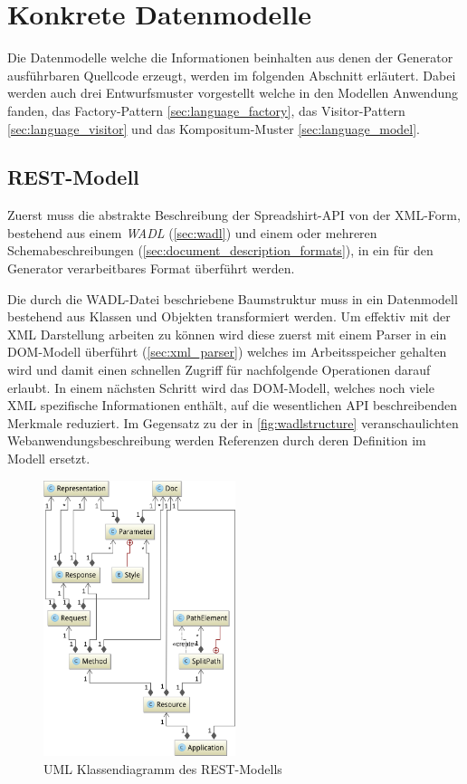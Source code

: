 \section{Konkrete Datenmodelle}
\label{sec:concrete_model}

Die Datenmodelle welche die Informationen beinhalten aus denen der Generator ausführbaren Quellcode erzeugt, werden im folgenden Abschnitt erläutert. Dabei werden auch drei Entwurfsmuster vorgestellt welche in den Modellen Anwendung fanden, das Factory-Pattern \cref{sec:language_factory}, das Visitor-Pattern \cref{sec:language_visitor} und das Kompositum-Muster \cref{sec:language_model}.

\subsection{REST-Modell}
\label{sec:rest_model}

Zuerst muss die abstrakte Beschreibung der Spreadshirt-API von der XML-Form, bestehend aus einem \emph{WADL} (\cref{sec:wadl}) und einem oder mehreren Schemabeschreibungen (\cref{sec:document_description_formats}), in ein für den Generator verarbeitbares Format überführt werden.

Die durch die WADL-Datei beschriebene Baumstruktur muss in ein Datenmodell bestehend aus Klassen und Objekten transformiert werden.
Um effektiv mit der XML Darstellung arbeiten zu können wird diese zuerst mit einem Parser in ein DOM-Modell überführt (\cref{sec:xml_parser}) welches im Arbeitsspeicher gehalten wird und damit einen schnellen Zugriff für nachfolgende Operationen darauf erlaubt. In einem nächsten Schritt wird das DOM-Modell, welches noch viele XML spezifische Informationen enthält, auf die wesentlichen API beschreibenden Merkmale reduziert. Im Gegensatz zu der in \cref{fig:wadlstructure} veranschaulichten Webanwendungsbeschreibung werden Referenzen durch deren Definition im Modell ersetzt.

\begin{figure}[tb]
    \begin{center}
        \includegraphics[width=0.5\textwidth]{resources/restmodel}
    \end{center}
    \caption{UML Klassendiagramm des REST-Modells}
    \label{fig:restmodel}
\end{figure}

